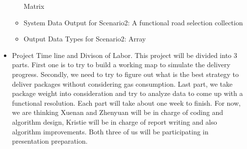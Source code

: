 \begin{itemize}
\begin{itemize}
Matrix
\item{System Data Output for Scenario2: }
A functional road selection collection
\item{Output Data Types for Scenario2: }
Array
\end{itemize}
\item{Project Time line and Divison of Labor.}
This project will be divided into 3 parts. First one is to try to build a working map to simulate the delivery progress. Secondly, we need to try to figure out what is the best strategy to deliver packages without considering gas consumption. Last part, we take package weight into consideration and try to analyze data to come up with a functional resolution. Each part will take about one week to finish. 
For now, we are thinking Xuenan and Zhenyuan will be in charge of coding and algorithm design, Kristie will be in charge of report writing and also algorithm improvements. Both three of us will be participating in presentation preparation.
\end{itemize}
